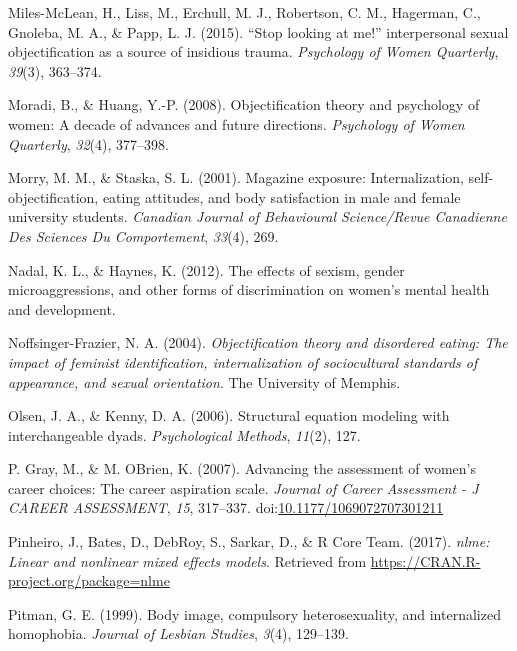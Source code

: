 \documentclass[man]{apa6}
\begin{document}
\hypertarget{ref-miles2015stop}{}
Miles-McLean, H., Liss, M., Erchull, M. J., Robertson, C. M., Hagerman,
C., Gnoleba, M. A., \& Papp, L. J. (2015). ``Stop looking at me!''
interpersonal sexual objectification as a source of insidious trauma.
\emph{Psychology of Women Quarterly}, \emph{39}(3), 363--374.

\hypertarget{ref-moradi2008}{}
Moradi, B., \& Huang, Y.-P. (2008). Objectification theory and
psychology of women: A decade of advances and future directions.
\emph{Psychology of Women Quarterly}, \emph{32}(4), 377--398.

\hypertarget{ref-morry2001magazine}{}
Morry, M. M., \& Staska, S. L. (2001). Magazine exposure:
Internalization, self-objectification, eating attitudes, and body
satisfaction in male and female university students. \emph{Canadian
Journal of Behavioural Science/Revue Canadienne Des Sciences Du
Comportement}, \emph{33}(4), 269.

\hypertarget{ref-nadal2012effects}{}
Nadal, K. L., \& Haynes, K. (2012). The effects of sexism, gender
microaggressions, and other forms of discrimination on women's mental
health and development.

\hypertarget{ref-noffsinger2004objectification}{}
Noffsinger-Frazier, N. A. (2004). \emph{Objectification theory and
disordered eating: The impact of feminist identification,
internalization of sociocultural standards of appearance, and sexual
orientation}. The University of Memphis.

\hypertarget{ref-olsen2006structural}{}
Olsen, J. A., \& Kenny, D. A. (2006). Structural equation modeling with
interchangeable dyads. \emph{Psychological Methods}, \emph{11}(2), 127.

\hypertarget{ref-grayobrien2007}{}
P. Gray, M., \& M. OBrien, K. (2007). Advancing the assessment of
women's career choices: The career aspiration scale. \emph{Journal of
Career Assessment - J CAREER ASSESSMENT}, \emph{15}, 317--337.
doi:\href{https://doi.org/10.1177/1069072707301211}{10.1177/1069072707301211}

\hypertarget{ref-R-nlme}{}
Pinheiro, J., Bates, D., DebRoy, S., Sarkar, D., \& R Core Team. (2017).
\emph{nlme: Linear and nonlinear mixed effects models}. Retrieved from
\url{https://CRAN.R-project.org/package=nlme}

\hypertarget{ref-pitman1999body}{}
Pitman, G. E. (1999). Body image, compulsory heterosexuality, and
internalized homophobia. \emph{Journal of Lesbian Studies}, \emph{3}(4),
129--139.
\end{document}
